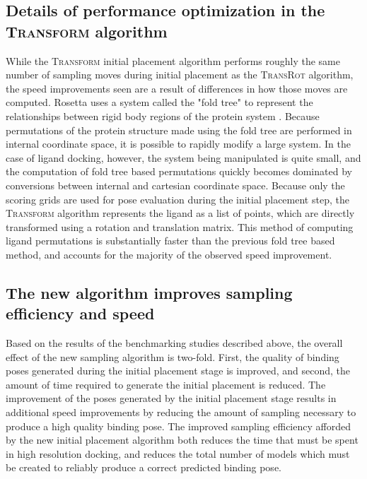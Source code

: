 \subsection{Details of performance optimization in the \textsc{Transform} algorithm}
While the \textsc{Transform} initial placement algorithm performs roughly the same number of sampling moves during initial placement as the \textsc{TransRot} algorithm, the speed improvements seen are a result of differences in how those moves are computed.
Rosetta uses a system called the "fold tree" to represent the relationships between rigid body regions of the protein system \citep{Davis:2009bf,Das:2008gf}.
Because permutations of the protein structure made using the fold tree are performed in internal coordinate space, it is possible to rapidly modify a large system.
In the case of ligand docking, however, the system being manipulated is quite small, and the computation of fold tree based permutations quickly becomes dominated by conversions between internal and cartesian coordinate space.
Because only the scoring grids are used for pose evaluation during the initial placement step, the \textsc{Transform} algorithm represents the ligand as a list of points, which are directly transformed using a rotation and translation matrix.
This method of computing ligand permutations is substantially faster than the previous fold tree based method, and accounts for the majority of the observed speed improvement.

\subsection{The new algorithm improves sampling efficiency and speed}
Based on the results of the benchmarking studies described above, the overall effect of the new sampling algorithm is two-fold.
First, the quality of binding poses generated during the initial placement stage is improved, and second, the amount of time required to generate the initial placement is reduced.
The improvement of the poses generated by the initial placement stage results in additional speed improvements by reducing the amount of sampling necessary to produce a high quality binding pose.
The improved sampling efficiency afforded by the new initial placement algorithm both reduces the time that must be spent in high resolution docking, and reduces the total number of models which must be created to reliably produce a correct predicted binding pose.

